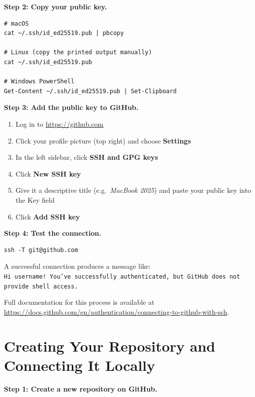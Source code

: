 \documentclass[nobib]{tufte-book}
\begin{document}
\medskip
\noindent\textbf{Step 2: Copy your public key.}

\begin{lstlisting}[style=bashstyle]
# macOS
cat ~/.ssh/id_ed25519.pub | pbcopy

# Linux (copy the printed output manually)
cat ~/.ssh/id_ed25519.pub

# Windows PowerShell
Get-Content ~/.ssh/id_ed25519.pub | Set-Clipboard
\end{lstlisting}

\medskip
\noindent\textbf{Step 3: Add the public key to GitHub.}

\begin{enumerate}
    \item Log in to \url{https://github.com}
    \item Click your profile picture (top right) and choose \textbf{Settings}
    \item In the left sidebar, click \textbf{SSH and GPG keys}
    \item Click \textbf{New SSH key}
    \item Give it a descriptive title (e.g.\ \textit{MacBook 2025}) and
          paste your public key into the Key field
    \item Click \textbf{Add SSH key}
\end{enumerate}

\medskip
\noindent\textbf{Step 4: Test the connection.}

\begin{lstlisting}[style=bashstyle]
ssh -T git@github.com
\end{lstlisting}

A successful connection produces a message like:\\[4pt]
\texttt{Hi username! You've successfully authenticated, but GitHub does not
provide shell access.}

\medskip
Full documentation for this process is available at
\url{https://docs.github.com/en/authentication/connecting-to-github-with-ssh}.

\section{Creating Your Repository and Connecting It Locally}

\noindent\textbf{Step 1: Create a new repository on GitHub.}
\end{document}
